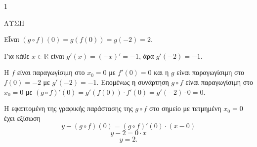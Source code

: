 \begin{ylh}{1}
    \item [Ύλη από εικόνα]
\end{ylh}
ΛΥΣΗ
\begin{alist}
\item[α)] Εἶναι $ (g \circ f)(0) = g(f(0)) = g(-2) = 2. $
\item[β)] Για κάθε $ x \in \mathbb{R} $ είναι $ g'(x) = (-x)' = -1 $, άρα $ g'(-2) = -1. $
\item[γ)] Η $f$ είναι παραγωγίσιμη στο $x_0 = 0$ με $f'(0) = 0$ και η $g$ είναι παραγωγίσιμη στο $f(0) = -2$ με $g'(-2) = -1$. Επομένως η συνάρτηση $g \circ f$ είναι παραγωγίσιμη στο $x_0 = 0$ με $ (g \circ f)'(0) = g'(f(0)) \cdot f'(0) = g'(-2) \cdot 0 = 0. $
\item[δ)] Η εφαπτομένη της γραφικής παράστασης της $g \circ f$ στο σημείο με τετμημένη $x_0 = 0$ έχει εξίσωση
    \[ y - (g \circ f)(0) = (g \circ f)'(0) \cdot (x - 0) \]
    \[ y - 2 = 0 \cdot x \]
    \[ y = 2. \]
\end{alist}
